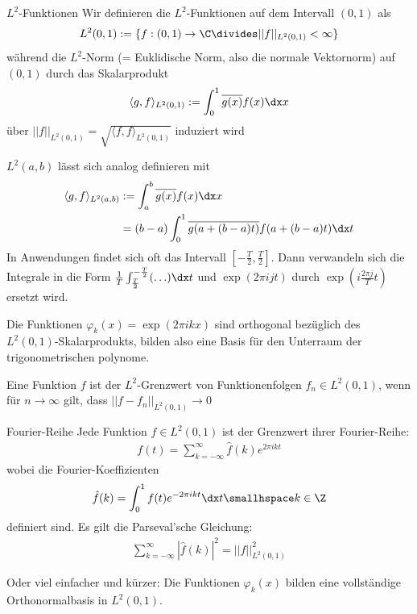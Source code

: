 \begin{definition}[]{$L^2$-Funktionen}
    Wir definieren die $L^2$-Funktionen auf dem Intervall $(0, 1)$ als
    \rmvspace
    \begin{align*}
        L^2(0, 1) := \{ f: (0, 1) \rightarrow \C \divides ||f||_{L^2(0, 1)} < \infty \}
    \end{align*}
    während die $L^2$-Norm (= Euklidische Norm, also die normale Vektornorm) auf $(0, 1)$ durch das Skalarprodukt
    \rmvspace
    \begin{align*}
        \langle g, f \rangle_{L^2(0, 1)} := \int_{0}^{1} \overline{g(x)} f(x) \dx x
    \end{align*}
    über $||f||_{L^2(0, 1)} = \sqrt{\langle f, f \rangle_{L^2(0, 1)}}$ induziert wird
\end{definition}

\inlineremark $L^2(a, b)$ lässt sich analog definieren mit
\rmvspace
\begin{align*}
    \langle g, f \rangle_{L^2(a, b)} & := \int_{a}^{b} \overline{g(x)} f(x) \dx x                              \\
                                     & = (b - a) \int_{0}^{1} \overline{g(a + (b - a)t)} f(a + (b - a)t) \dx t
\end{align*}
In Anwendungen findet sich oft das Intervall $\left[ -\frac{T}{2}, \frac{T}{2} \right]$.
Dann verwandeln sich die Integrale in die Form $\frac{1}{T} \int_{\frac{T}{2}}^{-\frac{T}{2}} (\ldots) \dx t$ und $\exp(2\pi ijt)$ durch $\exp(i \frac{2\pi j}{T} t)$ ersetzt wird.

\inlineremark Die Funktionen $\varphi_k(x) = \exp(2\pi ikx)$ sind orthogonal bezüglich des $L^2(0, 1)$-Skalarprodukts, bilden also eine Basis für den Unterraum der trigonometrischen polynome.


\inlinedef Eine Funktion $f$ ist der $L^2$-Grenzwert von Funktionenfolgen $f_n \in L^2(0, 1)$, wenn für $n \rightarrow \infty$ gilt, dass $||f - f_n||_{L^2(0, 1)} \rightarrow 0$


\newpage
\begin{theorem}[]{Fourier-Reihe}
    Jede Funktion $f \in L^2(0, 1)$ ist der Grenzwert ihrer Fourier-Reihe:
    \rmvspace
    \begin{align*}
        f(t) = \sum_{k = -\infty}^{\infty} \hat{f}(k) e^{2\pi ikt}
    \end{align*}
    wobei die Fourier-Koeffizienten
    \rmvspace
    \begin{align*}
        \hat{f}(k) = \int_{0}^{1} f(t)e^{-2\pi ikt} \dx t \smallhspace k \in \Z
    \end{align*}
    definiert sind. Es gilt die Parseval'sche Gleichung:
    \rmvspace
    \begin{align*}
        \sum_{k = -\infty}^{\infty} |\hat{f}(k)|^2 = ||f||_{L^2(0, 1)}^2
    \end{align*}
\end{theorem}
\inlineremark Oder viel einfacher und kürzer: Die Funktionen $\varphi_k(x)$ bilden eine vollständige Orthonormalbasis in $L^2(0, 1)$.

